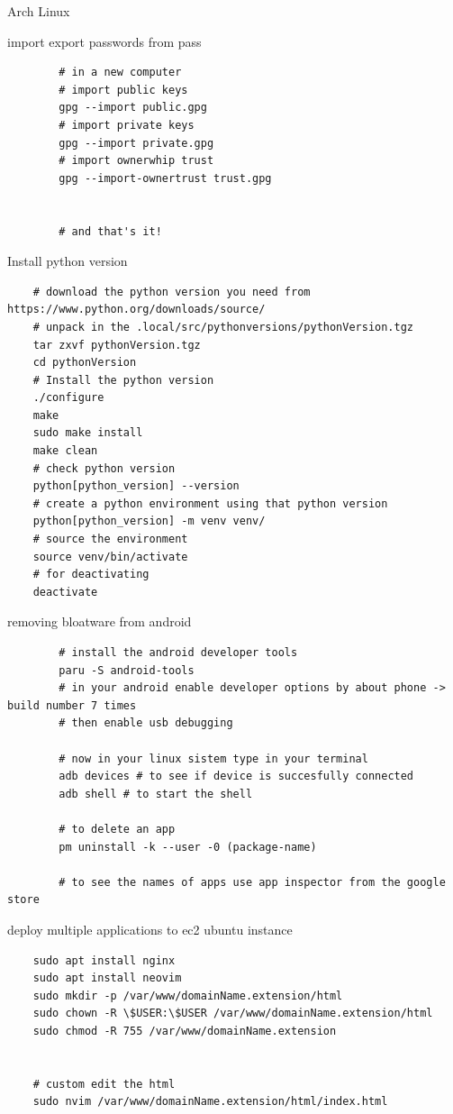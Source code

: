 \begin{section}{Arch Linux}
\begin{subsection}{import export passwords from pass}
\begin{verbatim}
		# in a new computer
		# import public keys
		gpg --import public.gpg
		# import private keys
		gpg --import private.gpg
		# import ownerwhip trust
		gpg --import-ownertrust trust.gpg


		# and that's it!
	\end{verbatim}
	\end{subsection}

	\begin{section}{Install python version}
		\begin{verbatim}
	# download the python version you need from https://www.python.org/downloads/source/
	# unpack in the .local/src/pythonversions/pythonVersion.tgz
	tar zxvf pythonVersion.tgz
	cd pythonVersion
	# Install the python version
	./configure
	make
	sudo make install
	make clean
	# check python version
	python[python_version] --version
	# create a python environment using that python version
	python[python_version] -m venv venv/
	# source the environment
	source venv/bin/activate
	# for deactivating
	deactivate
		\end{verbatim}
	\end{section}

	\begin{subsection}{removing bloatware from android}
	
		\begin{verbatim}
		# install the android developer tools
		paru -S android-tools
		# in your android enable developer options by about phone -> build number 7 times
		# then enable usb debugging

		# now in your linux sistem type in your terminal
		adb devices # to see if device is succesfully connected
		adb shell # to start the shell

		# to delete an app
		pm uninstall -k --user -0 (package-name)

		# to see the names of apps use app inspector from the google store
		\end{verbatim}




\end{subsection}
\begin{section}{deploy multiple applications to ec2 ubuntu instance}
	\begin{verbatim}
	sudo apt install nginx
	sudo apt install neovim
	sudo mkdir -p /var/www/domainName.extension/html
	sudo chown -R \$USER:\$USER /var/www/domainName.extension/html
	sudo chmod -R 755 /var/www/domainName.extension

	
	# custom edit the html
	sudo nvim /var/www/domainName.extension/html/index.html



\end{verbatim}
\end{section}
\end{section}
